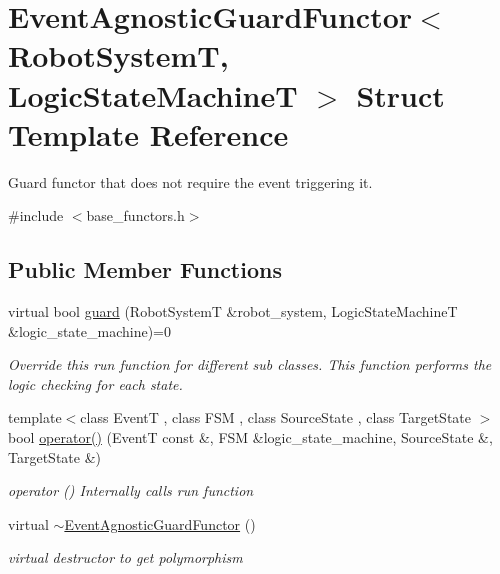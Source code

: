 \hypertarget{structEventAgnosticGuardFunctor}{\section{Event\-Agnostic\-Guard\-Functor$<$ Robot\-System\-T, Logic\-State\-Machine\-T $>$ Struct Template Reference}
\label{structEventAgnosticGuardFunctor}
}


Guard functor that does not require the event triggering it.  




{\ttfamily \#include $<$base\-\_\-functors.\-h$>$}

\subsection*{Public Member Functions}
\begin{DoxyCompactItemize}
\item 
virtual bool \hyperlink{structEventAgnosticGuardFunctor_ad97196f6a607d199d6dbd56156b8dd8c}{guard} (Robot\-System\-T \&robot\-\_\-system, Logic\-State\-Machine\-T \&logic\-\_\-state\-\_\-machine)=0
\begin{DoxyCompactList}\small\item\em Override this run function for different sub classes. This function performs the logic checking for each state. \end{DoxyCompactList}\item 
{\footnotesize template$<$class Event\-T , class F\-S\-M , class Source\-State , class Target\-State $>$ }\\bool \hyperlink{structEventAgnosticGuardFunctor_a775411c4c4e0815298200f895af3c02b}{operator()} (Event\-T const \&, F\-S\-M \&logic\-\_\-state\-\_\-machine, Source\-State \&, Target\-State \&)
\begin{DoxyCompactList}\small\item\em operator () Internally calls run function \end{DoxyCompactList}\item 
virtual \hyperlink{structEventAgnosticGuardFunctor_aa339ada7b22b27bc6d384445d109f4e6}{$\sim$\-Event\-Agnostic\-Guard\-Functor} ()
\begin{DoxyCompactList}\small\item\em virtual destructor to get polymorphism \end{DoxyCompactList}\end{DoxyCompactItemize}


